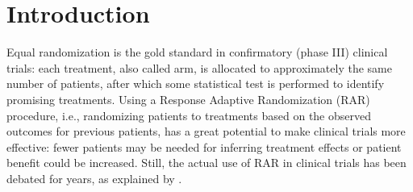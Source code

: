 \documentclass[11pt]{article}
\theoremstyle{plain}
\theoremstyle{definition}
\begin{document}
\begin{abstract}
%

	\end{abstract}
	
	\section{Introduction}
Equal randomization is the gold standard in confirmatory (phase III) clinical trials: each treatment, also called arm, is allocated to approximately the same number of patients, after which some statistical test is performed to identify promising treatments. Using a Response Adaptive Randomization (RAR) procedure, i.e., randomizing patients to treatments based on the observed outcomes for previous patients, has a great potential to make clinical trials more effective: fewer patients may be needed for inferring treatment effects or patient benefit could be increased. Still, the actual use of RAR in clinical trials has been debated for years, as explained  by \cite{Villar23Review}.
\end{document}
